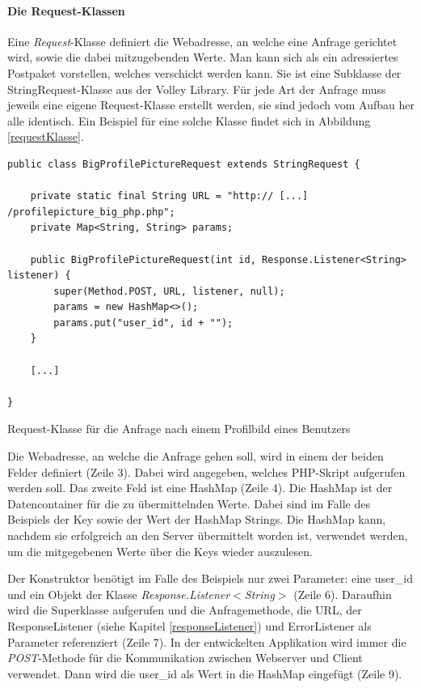 \documentclass[../main.tex]{subfiles}
\begin{document}
	\paragraph{Die Request-Klassen}
	Eine \emph{Request}-Klasse definiert die Webadresse, an welche eine Anfrage gerichtet wird, sowie die dabei mitzugebenden Werte. Man kann sich als ein adressiertes Postpaket vorstellen, welches verschickt werden kann. Sie ist eine Subklasse der StringRequest-Klasse aus der Volley Library. Für jede Art der Anfrage muss jeweils eine eigene Request-Klasse erstellt werden, sie sind jedoch vom Aufbau her alle identisch. Ein Beispiel für eine solche Klasse findet sich in Abbildung \ref{requestKlasse}.
	
\begin{code}
	\begin{center}
		\begin{verbatim}
public class BigProfilePictureRequest extends StringRequest {

	private static final String URL = "http:// [...] /profilepicture_big_php.php";
	private Map<String, String> params;

	public BigProfilePictureRequest(int id, Response.Listener<String> listener) {
		super(Method.POST, URL, listener, null);
		params = new HashMap<>();
		params.put("user_id", id + "");
	}

	[...]
	
}
		\end{verbatim}
		\caption{Request-Klasse für die Anfrage nach einem Profilbild eines Benutzers}
		\label{requestKlasse}
	\end{center}
\end{code}

	Die Webadresse, an welche die Anfrage gehen soll, wird in einem der beiden Felder definiert (Zeile 3). Dabei wird angegeben, welches PHP-Skript aufgerufen werden soll. Das zweite Feld ist eine HashMap (Zeile 4). Die HashMap ist der Datencontainer für die zu übermittelnden Werte. Dabei sind im Falle des Beispiels der Key sowie der Wert der HashMap Strings. Die HashMap kann, nachdem sie erfolgreich an den Server übermittelt worden ist, verwendet werden, um die mitgegebenen Werte über die Keys wieder auszulesen.
	
	Der Konstruktor benötigt im Falle des Beispiels nur zwei Parameter: eine user\_id und ein Objekt der Klasse \emph{Response.Listener$<$String$>$} (Zeile 6). Daraufhin wird die Superklasse aufgerufen und die Anfragemethode, die URL, der ResponseListener (siehe Kapitel \ref{responseListener}) und ErrorListener als Parameter referenziert (Zeile 7). In der entwickelten Applikation wird immer die \emph{POST}-Methode für die Kommunikation zwischen Webserver und Client verwendet. Dann wird die user\_id als Wert in die HashMap eingefügt (Zeile 9).
	
\end{document}
